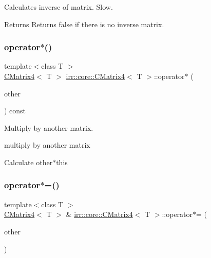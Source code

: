 Calculates inverse of matrix. Slow. 

\begin{DoxyReturn}{Returns}
Returns false if there is no inverse matrix. 
\end{DoxyReturn}
\mbox{\label{classirr_1_1core_1_1CMatrix4_af5ecb6176941d57716bb800963042183}} 
\subsubsection{\texorpdfstring{operator$\ast$()}{operator*()}}
{\footnotesize\ttfamily template$<$class T $>$ \\
\hyperlink{classirr_1_1core_1_1CMatrix4}{C\+Matrix4}$<$ T $>$ \hyperlink{classirr_1_1core_1_1CMatrix4}{irr\+::core\+::\+C\+Matrix4}$<$ T $>$\+::operator$\ast$ (\begin{DoxyParamCaption}\item[{const \hyperlink{classirr_1_1core_1_1CMatrix4}{C\+Matrix4}$<$ T $>$ \&}]{other }\end{DoxyParamCaption}) const\hspace{0.3cm}{\ttfamily [inline]}}



Multiply by another matrix. 

multiply by another matrix

Calculate other$\ast$this \mbox{\label{classirr_1_1core_1_1CMatrix4_ac3d29f86c91d9d095ab155ecb8870f87}} 
\subsubsection{\texorpdfstring{operator$\ast$=()}{operator*=()}}
{\footnotesize\ttfamily template$<$class T $>$ \\
\hyperlink{classirr_1_1core_1_1CMatrix4}{C\+Matrix4}$<$ T $>$ \& \hyperlink{classirr_1_1core_1_1CMatrix4}{irr\+::core\+::\+C\+Matrix4}$<$ T $>$\+::operator$\ast$= (\begin{DoxyParamCaption}\item[{const \hyperlink{classirr_1_1core_1_1CMatrix4}{C\+Matrix4}$<$ T $>$ \&}]{other }\end{DoxyParamCaption})\hspace{0.3cm}{\ttfamily [inline]}}



